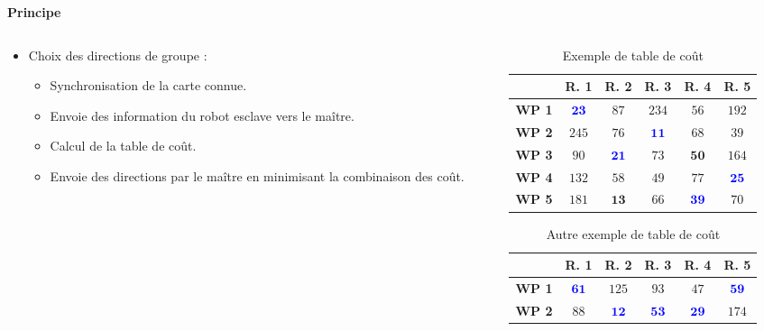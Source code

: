\documentclass[aspectratio=169,10pt]{beamer}
\begin{document}
\begin{frame}{\textbf{Principe}}
	\begin{columns}
		\begin{column}{0.5\textwidth}
			\begin{itemize}
				\item Choix des directions de groupe :
				\begin{itemize}
					\item Synchronisation de la carte connue.
					\vspace{0.2cm}
					\item Envoie des information du robot esclave vers le maître.
					\vspace{0.2cm}
					\item Calcul de la table de coût.
					\vspace{0.2cm}
					\item Envoie des directions par le maître en minimisant la combinaison des coût.
				\end{itemize}
			\end{itemize}
		\end{column}
		\begin{column}{0.5\textwidth}
			\begin{table}[H]
				\centering
				\begin{tabular}{c c c c c c}
					\hline
					& \textbf{R. 1} & \textbf{R. 2} & \textbf{R. 3} & \textbf{R. 4} & \textbf{R. 5}\\
					\hline
					\textbf{WP 1} & \textcolor{blue}{$\mathbf{23}$} & $87$ & $234$ & $56$ & $192$ \\
					\textbf{WP 2} & $245$ & $76$ & \textcolor{blue}{$\mathbf{11}$} & $68$ & $39$ \\
					\textbf{WP 3} & $90$ & \textcolor{blue}{$\mathbf{21}$} & $73$ & $\mathbf{50}$ & $164$ \\
					\textbf{WP 4} & $132$ & $58$ & $49$ & $77$ & \textcolor{blue}{$\mathbf{25}$} \\
					\textbf{WP 5} & $181$ & $\mathbf{13}$ & $66$ & \textcolor{blue}{$\mathbf{39}$} & $70$ \\ 
					\hline
				\end{tabular}
				\caption{Exemple de table de coût}
				\label{tab:example_5R5WP}
			\end{table}
			\begin{table}[H]
				\centering
				\begin{tabular}{c c c c c c}
					\hline
					& \textbf{R. 1} & \textbf{R. 2} & \textbf{R. 3} & \textbf{R. 4} & \textbf{R. 5}\\
					\hline
					\textbf{WP 1} & \textcolor{blue}{$\mathbf{61}$} & $125$ & $93$ & $47$ & \textcolor{blue}{$\mathbf{59}$} \\
					\textbf{WP 2} & $88$ & \textcolor{blue}{$\mathbf{12}$} & \textcolor{blue}{$\mathbf{53}$} & \textcolor{blue}{$\mathbf{29}$} & $174$ \\ 
					\hline
				\end{tabular}
				\caption{Autre exemple de table de coût}
				\label{tab:example_5R2WP}
			\end{table}
		\end{column}
	\end{columns}
\end{frame}
\end{document}
